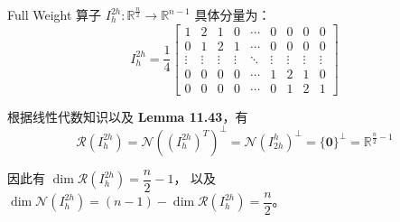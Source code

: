 \documentclass[a4paper]{article}
\begin{document}
\par Full Weight 算子 $I_{h}^{2h}:\mathbb{R}^{\frac{n}{2}} \to \mathbb{R}^{n-1}$
具体分量为：
\begin{equation}
    I_{h}^{2h}=\frac{1}{4}
    \begin{bmatrix}
        1 & 2 & 1 & 0 & \cdots & 0 & 0 & 0 & 0\\
        0 & 1 & 2 & 1 & \cdots & 0 & 0 & 0 & 0\\
        \vdots & \vdots & \vdots & \vdots & \ddots & \vdots& \vdots& \vdots& \vdots\\
        0 & 0 & 0 & 0 & \cdots & 1 & 2 & 1 & 0\\
        0 & 0 & 0 & 0 & \cdots & 0 & 1 & 2 & 1
    \end{bmatrix}
\end{equation}
\par 根据线性代数知识以及 \textbf{Lemma 11.43}，有 
\begin{equation}
    \mathcal{R}(I_{h}^{2h}) = \mathcal{N}\left((I_{h}^{2h})^T\right)^{\perp}
    =\mathcal{N}\left(I_{2h}^{h}\right)^{\perp}
    =\{\bm{0}\}^{\perp} = \mathbb{R}^{\frac{n}{2}-1}
\end{equation}
\par 因此有 $\dim\mathcal{R}(I_{h}^{2h}) = \dfrac{n}{2}-1$，
以及 $\dim\mathcal{N}(I_{h}^{2h}) = (n-1)-\dim\mathcal{R}(I_{h}^{2h})
=\dfrac{n}{2}$。


\printbibliography
\end{document}
